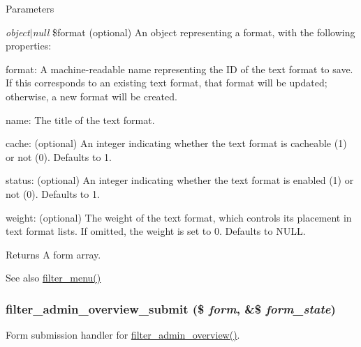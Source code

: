 \begin{DoxyParams}{Parameters}
\item[{\em object$|$null}]\$format (optional) An object representing a format, with the following properties:
\begin{DoxyItemize}
\item format: A machine-\/readable name representing the ID of the text format to save. If this corresponds to an existing text format, that format will be updated; otherwise, a new format will be created.
\item name: The title of the text format.
\item cache: (optional) An integer indicating whether the text format is cacheable (1) or not (0). Defaults to 1.
\item status: (optional) An integer indicating whether the text format is enabled (1) or not (0). Defaults to 1.
\item weight: (optional) The weight of the text format, which controls its placement in text format lists. If omitted, the weight is set to 0. Defaults to NULL.
\end{DoxyItemize}\end{DoxyParams}
\begin{DoxyReturn}{Returns}
A form array.
\end{DoxyReturn}
\begin{DoxySeeAlso}{See also}
\hyperlink{filter_8module_a13c5612763d7d98499832594ac3d5466}{filter\_\-menu()} 
\end{DoxySeeAlso}
\hypertarget{filter_8admin_8inc_a60b5bbf55b2f0678c64ae17f613d03d0}{
\subsubsection[{filter\_\-admin\_\-overview\_\-submit}]{\setlength{\rightskip}{0pt plus 5cm}filter\_\-admin\_\-overview\_\-submit (\$ {\em form}, \/  \&\$ {\em form\_\-state})}}
\label{filter_8admin_8inc_a60b5bbf55b2f0678c64ae17f613d03d0}
Form submission handler for \hyperlink{group__forms_ga3fc30971380683ced638edbd19d1390c}{filter\_\-admin\_\-overview()}. 